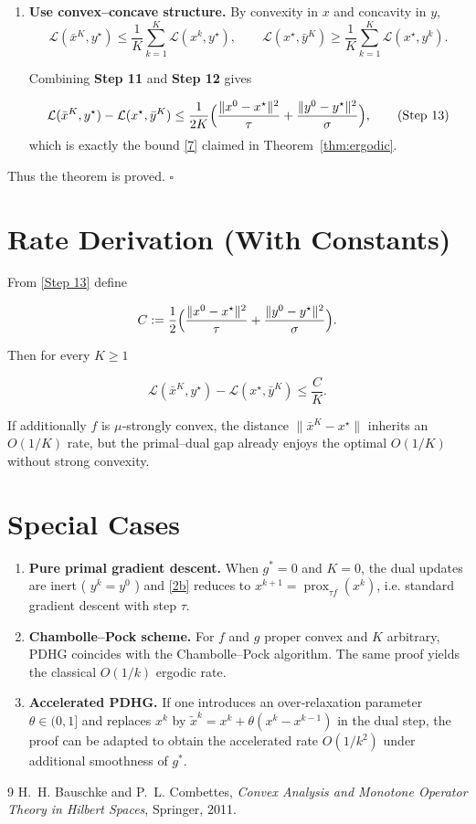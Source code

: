 \documentclass{article}
\begin{document}
\begin{enumerate}
\[
\frac{1}{2\tau}\|x^{0}-x^{\star}\|^{2}
+\frac{1}{2\sigma}\|y^{0}-y^{\star}\|^{2}
\ge \sum_{k=0}^{K-1}\bigl[\mathcal L(x^{k+1},y^{\star})-\mathcal L(x^{\star},y^{k+1})\bigr].
\tag{Step 11}
\]

\item \textbf{Use convex–concave structure.}  
By convexity in $x$ and concavity in $y$,
\[
\mathcal L(\bar x^{K},y^{\star})\le\frac{1}{K}\sum_{k=1}^{K}\mathcal L(x^{k},y^{\star}),\qquad
\mathcal L(x^{\star},\bar y^{K})\ge\frac{1}{K}\sum_{k=1}^{K}\mathcal L(x^{\star},y^{k}).
\tag{Step 12}
\]

Combining \textbf{Step 11} and \textbf{Step 12} gives

\[
\mathcal L(\bar x^{K},y^{\star})-\mathcal L(x^{\star},\bar y^{K})
\le\frac{1}{2K}\Bigl(\frac{\|x^{0}-x^{\star}\|^{2}}{\tau}
+\frac{\|y^{0}-y^{\star}\|^{2}}{\sigma}\Bigr),
\tag{Step 13}
\]
which is exactly the bound \eqref{7} claimed in Theorem~\ref{thm:ergodic}.
\end{enumerate}

Thus the theorem is proved. \hfill $\square$

\section*{Rate Derivation (With Constants)}
From \eqref{Step 13} define  

\[
C:=\frac12\Bigl(\frac{\|x^{0}-x^{\star}\|^{2}}{\tau}
+\frac{\|y^{0}-y^{\star}\|^{2}}{\sigma}\Bigr).
\]

Then for every $K\ge1$  

\[
\mathcal L(\bar x^{K},y^{\star})-\mathcal L(x^{\star},\bar y^{K})\le \frac{C}{K}.
\tag{14}
\]

If additionally $f$ is $\mu$‑strongly convex, the distance $\| \bar x^{K}-x^{\star}\|$ inherits an $O(1/K)$ rate, but the primal–dual gap already enjoys the optimal $O(1/K)$ without strong convexity.

\section*{Special Cases}
\begin{enumerate}[nosep]
\item \textbf{Pure primal gradient descent.}  
When $g^{*}=0$ and $K=0$, the dual updates are inert ( $y^{k}=y^{0}$ ) and \eqref{2b} reduces to $x^{k+1}= \operatorname{prox}_{\tau f}(x^{k})$, i.e. standard gradient descent with step $\tau$.
\item \textbf{Chambolle–Pock scheme.}  
For $f$ and $g$ proper convex and $K$ arbitrary, PDHG coincides with the Chambolle–Pock algorithm. The same proof yields the classical $O(1/k)$ ergodic rate.
\item \textbf{Accelerated PDHG.}  
If one introduces an over‑relaxation parameter $\theta\in(0,1]$ and replaces $x^{k}$ by $\tilde x^{k}=x^{k}+\theta (x^{k}-x^{k-1})$ in the dual step, the proof can be adapted to obtain the accelerated rate $O(1/k^{2})$ under additional smoothness of $g^{*}$.
\end{enumerate}

\begin{thebibliography}{9}
H.~H. Bauschke and P.~L. Combettes,
\textit{Convex Analysis and Monotone Operator Theory in Hilbert Spaces},
Springer, 2011.
\end{thebibliography}
\end{document}
